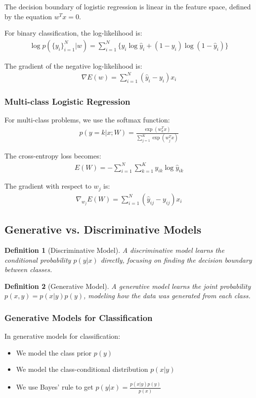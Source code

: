 \documentclass{article}
\newtheorem{definition}{Definition}
\begin{document}
The decision boundary of logistic regression is linear in the feature space, defined by the equation $w^Tx = 0$.

For binary classification, the log-likelihood is:
\begin{align}
\log p(\{y_i\}_{i=1}^{N}|w) = \sum_{i=1}^{N}\{y_i\log\hat{y}_i + (1-y_i)\log(1-\hat{y}_i)\}
\end{align}

The gradient of the negative log-likelihood is:
\begin{align}
\nabla E(w) = \sum_{i=1}^{N}(\hat{y}_i - y_i)x_i
\end{align}

\subsubsection{Multi-class Logistic Regression}
For multi-class problems, we use the softmax function:
\begin{align}
p(y=k|x;W) = \frac{\exp(w_k^Tx)}{\sum_{j=1}^{K}\exp(w_j^Tx)}
\end{align}

The cross-entropy loss becomes:
\begin{align}
E(W) = -\sum_{i=1}^{N}\sum_{k=1}^{K}y_{ik}\log\hat{y}_{ik}
\end{align}

The gradient with respect to $w_j$ is:
\begin{align}
\nabla_{w_j}E(W) = \sum_{i=1}^{N}(\hat{y}_{ij} - y_{ij})x_i
\end{align}

\subsection{Generative vs. Discriminative Models}
\begin{definition}[Discriminative Model]
A discriminative model learns the conditional probability $p(y|x)$ directly, focusing on finding the decision boundary between classes.
\end{definition}

\begin{definition}[Generative Model]
A generative model learns the joint probability $p(x,y) = p(x|y)p(y)$, modeling how the data was generated from each class.
\end{definition}

\subsubsection{Generative Models for Classification}
In generative models for classification:
\begin{itemize}
\item We model the class prior $p(y)$
\item We model the class-conditional distribution $p(x|y)$
\item We use Bayes' rule to get $p(y|x) = \frac{p(x|y)p(y)}{p(x)}$
\end{itemize}
\end{document}
